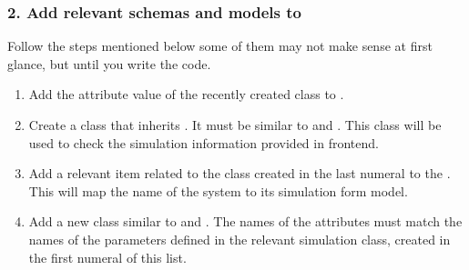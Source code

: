 \documentclass[a4paper,landscape,10pt,english]{sphinxmanual}
\begin{document}
\subsubsection{2. Add relevant schemas and models to }
\label{\detokenize{code_docs/new_simulation:add-relevant-schemas-and-models-to-schemas}}\label{\detokenize{code_docs/new_simulation:new-simulation-schemas}}
Follow the steps mentioned below \textendash{}some of them may not make sense at first
glance, but until you write the code.
\begin{enumerate}
%
\item {} 
Add the {\hyperref[\detokenize{code_docs/simulation_api.simulation:simulation_api.simulation.simulations.Simulation.system}]{}}
attribute value of the recently created class to
{\hyperref[\detokenize{code_docs/simulation_api.controller:simulation_api.controller.schemas.SimSystem}]{}}.

\item {} 
Create a class that inherits {\hyperref[\detokenize{code_docs/simulation_api.controller:simulation_api.controller.schemas.SimForm}]{}}.
It must be similar to {\hyperref[\detokenize{code_docs/simulation_api.controller:simulation_api.controller.schemas.HOSimForm}]{}}
and {\hyperref[\detokenize{code_docs/simulation_api.controller:simulation_api.controller.schemas.ChenLeeSimForm}]{}}. This class
will be used to check the simulation information provided in frontend.

\item {} 
Add a relevant item \textendash{}related to the class created in the last numeral\textendash{} to the
 {\hyperref[\detokenize{code_docs/simulation_api.controller:simulation_api.controller.schemas.SimFormDict}]{}}. This will
map the name of the system to its simulation form model.

\item {} 
Add a new class similar to {\hyperref[\detokenize{code_docs/simulation_api.controller:simulation_api.controller.schemas.HOParams}]{}}
and {\hyperref[\detokenize{code_docs/simulation_api.controller:simulation_api.controller.schemas.ChenLeeParams}]{}}. The names
of the attributes must match the names of the parameters defined in the
relevant simulation class, created in the first numeral of this list.


\end{enumerate}
\end{document}

